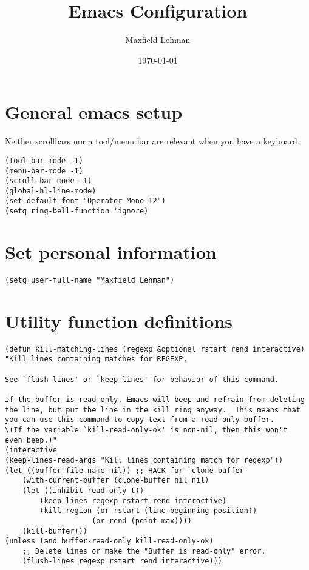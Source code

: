 \documentclass[11pt]{article}
\author{Maxfield Lehman}
\date{\today}
\title{Emacs Configuration}
\begin{document}
\maketitle
\tableofcontents


\section{General emacs setup}
\label{sec-1}
Neither scrollbars nor a tool/menu bar are relevant when you have a keyboard.
\begin{verbatim}
(tool-bar-mode -1)
(menu-bar-mode -1)
(scroll-bar-mode -1)
(global-hl-line-mode)
(set-default-font "Operator Mono 12")
(setq ring-bell-function 'ignore)
\end{verbatim}


\section{Set personal information}
\label{sec-2}
\begin{verbatim}
(setq user-full-name "Maxfield Lehman")
\end{verbatim}


\section{Utility function definitions}
\label{sec-3}
\begin{verbatim}
(defun kill-matching-lines (regexp &optional rstart rend interactive)
"Kill lines containing matches for REGEXP.

See `flush-lines' or `keep-lines' for behavior of this command.

If the buffer is read-only, Emacs will beep and refrain from deleting
the line, but put the line in the kill ring anyway.  This means that
you can use this command to copy text from a read-only buffer.
\(If the variable `kill-read-only-ok' is non-nil, then this won't
even beep.)"
(interactive
(keep-lines-read-args "Kill lines containing match for regexp"))
(let ((buffer-file-name nil)) ;; HACK for `clone-buffer'
    (with-current-buffer (clone-buffer nil nil)
    (let ((inhibit-read-only t))
        (keep-lines regexp rstart rend interactive)
        (kill-region (or rstart (line-beginning-position))
                    (or rend (point-max))))
    (kill-buffer)))
(unless (and buffer-read-only kill-read-only-ok)
    ;; Delete lines or make the "Buffer is read-only" error.
    (flush-lines regexp rstart rend interactive)))
\end{verbatim}
\end{document}
